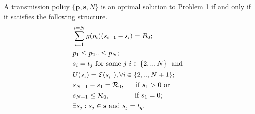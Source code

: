 \begin{theorem}
A transmission policy $\{\textbf{p},\textbf{s},N\}$ is an optimal solution to Problem 1 if and only if it satisfies the following structure.
\label{th_algo1_1}
\begin{align}
&\sum_{i=1}^{i=N}g(p_i)(s_{i+1}-s_i)=B_0; 								
\label{claim1}
\\
&p_1\le p_2 ..\le p_N;
\label{claim3}  
\\
&\nonumber s_i=t_j \text{ for some } j, i\in \{2,..,N\} \ \text{ and }
\\
& U(s_i)=\ETx(s_i^-), \forall i\in \{2,..,N+1\};
\label{claim4}
\\
&\nonumber s_{N+1}-s_1=\mathcal{R}_0, 	 \ \ \ \ 						\text{ if } s_1>0 \text{ or }
\\
& s_{N+1}\le \mathcal{R}_0,				\ \ \ \ \ \ \ \ \ \				\text{ if } s_1=0;
\label{claim2}
\\
&\exists s_j:s_j\in \textbf{s} \text{ and } s_j=t_q.
\label{claim5}
\end{align}
\end{theorem}
